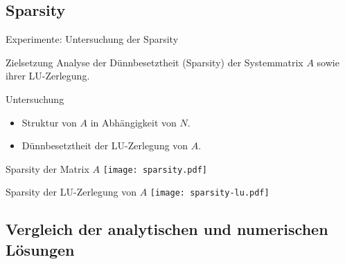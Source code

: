\documentclass[9pt, t]{beamer}
\begin{document}
\subsection{Sparsity}

\begin{frame}{Experimente: Untersuchung der Sparsity}
    \begin{block}{Zielsetzung}
        Analyse der Dünnbesetztheit (Sparsity) der Systemmatrix \(A\) sowie ihrer LU-Zerlegung.
    \end{block}
    \pause%
    \begin{block}{Untersuchung}
        \begin{itemize}[<+->]
            \item Struktur von \(A\) in Abhängigkeit von \(N\).
            \item Dünnbesetztheit der LU-Zerlegung von \(A\).
        \end{itemize}
    \end{block}
\end{frame}

\begin{frame}{Sparsity der Matrix \(A\)}
    \centering
    \texttt{[image: sparsity.pdf]}
\end{frame}

\begin{frame}{Sparsity der LU-Zerlegung von \(A\)}
    \centering
    \texttt{[image: sparsity-lu.pdf]}
\end{frame}

%
\subsection{Vergleich der analytischen und numerischen Lösungen}
\end{document}
